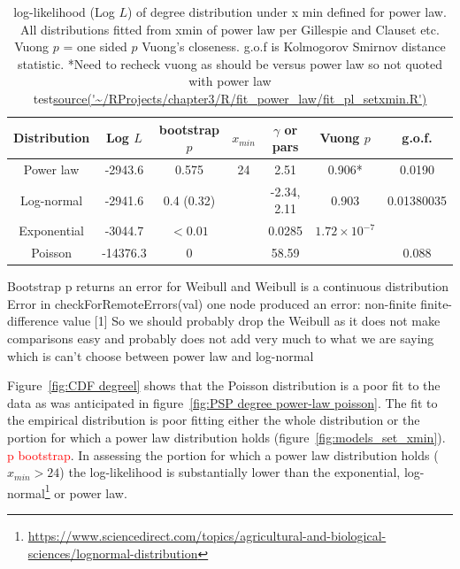 \begin{table}[]
    \centering
    
    \begin{tabular}{ccccccc}
    \toprule
        Distribution & Log $L$ & bootstrap $p$ & $x_{min}$ & $\gamma$ or pars & Vuong $p$  &g.o.f.\\
        \midrule
        Power law &  -2943.6 & 0.575 & 24 & 2.51 & 0.906* &  0.0190\\
        Log-normal & -2941.6 & 0.4 (0.32) &&-2.34, 2.11& 0.903 &  0.01380035\\
        Exponential & -3044.7 & $<0.01$&&0.0285& $1.72\times10^{-7}$\\
        Poisson & -14376.3 & 0&&58.59 & & 0.088\\
    
        \bottomrule
    \end{tabular}
    \caption[Log $L$ of degree distribution under different models]{log-likelihood (Log $L$) of degree distribution under x min defined for power law. All distributions fitted from xmin of power law per Gillespie and Clauset etc. Vuong $p$ = one sided $p$ Vuong's closeness. g.o.f is Kolmogorov Smirnov distance statistic. *Need to recheck vuong as should be versus power law so not quoted with power law test\url{source('~/RProjects/chapter3/R/fit_power_law/fit_pl_setxmin.R')} }
    \tiny{Bootstrap p returns an error for Weibull and Weibull is a continuous distribution Error in checkForRemoteErrors(val) one node produced an error: non-finite finite-difference value [1] So we should probably drop the Weibull as it does not make comparisons easy and probably does not add very much to what we are saying which is can't choose between power law and log-normal}
    \label{tab:ll distributions}
\end{table}


Figure~\ref{fig:CDF degreel} shows that the Poisson distribution is a poor fit to the data as was anticipated in figure~\ref{fig:PSP degree power-law poisson}. The fit to the empirical distribution is poor fitting either the whole distribution or the portion for which a power law distribution holds (figure~\ref{fig:models_set_xmin}). \textcolor{red}{p bootstrap}. In assessing the portion for which a power law distribution holds ($x_{min}>24$) the log-likelihood is substantially lower than the exponential, log-normal\footnote{\url{https://www.sciencedirect.com/topics/agricultural-and-biological-sciences/lognormal-distribution}} or power law. 

